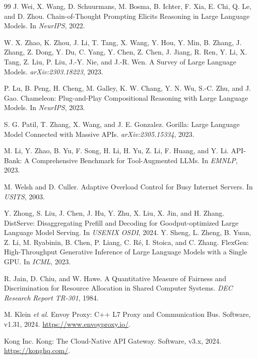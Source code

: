 \documentclass[sigconf,review,anonymous]{acmart}
\begin{document}
\begin{thebibliography}{99}
J. Wei, X. Wang, D. Schuurmans, M. Bosma, B. Ichter, F. Xia, E. Chi, Q. Le, and D. Zhou.
\newblock Chain-of-Thought Prompting Elicits Reasoning in Large Language Models.
\newblock In \emph{NeurIPS}, 2022.

W. X. Zhao, K. Zhou, J. Li, T. Tang, X. Wang, Y. Hou, Y. Min, B. Zhang, J. Zhang, Z. Dong, Y. Du, C. Yang, Y. Chen, Z. Chen, J. Jiang, R. Ren, Y. Li, X. Tang, Z. Liu, P. Liu, J.-Y. Nie, and J.-R. Wen.
\newblock A Survey of Large Language Models.
\newblock \emph{arXiv:2303.18223}, 2023.

P. Lu, B. Peng, H. Cheng, M. Galley, K. W. Chang, Y. N. Wu, S.-C. Zhu, and J. Gao.
\newblock Chameleon: Plug-and-Play Compositional Reasoning with Large Language Models.
\newblock In \emph{NeurIPS}, 2023.

S. G. Patil, T. Zhang, X. Wang, and J. E. Gonzalez.
\newblock Gorilla: Large Language Model Connected with Massive APIs.
\newblock \emph{arXiv:2305.15334}, 2023.

M. Li, Y. Zhao, B. Yu, F. Song, H. Li, H. Yu, Z. Li, F. Huang, and Y. Li.
\newblock API-Bank: A Comprehensive Benchmark for Tool-Augmented LLMs.
\newblock In \emph{EMNLP}, 2023.

M. Welsh and D. Culler.
\newblock Adaptive Overload Control for Busy Internet Servers.
\newblock In \emph{USITS}, 2003.

Y. Zhong, S. Liu, J. Chen, J. Hu, Y. Zhu, X. Liu, X. Jin, and H. Zhang.
\newblock DistServe: Disaggregating Prefill and Decoding for Goodput-optimized Large Language Model Serving.
\newblock In \emph{USENIX OSDI}, 2024.
Y. Sheng, L. Zheng, B. Yuan, Z. Li, M. Ryabinin, B. Chen, P. Liang, C. R\'{e}, I. Stoica, and C. Zhang.
\newblock FlexGen: High-Throughput Generative Inference of Large Language Models with a Single GPU.
\newblock In \emph{ICML}, 2023.

R. Jain, D. Chiu, and W. Hawe.
\newblock A Quantitative Measure of Fairness and Discrimination for Resource Allocation in Shared Computer Systems.
\newblock \emph{DEC Research Report TR-301}, 1984.

M. Klein \emph{et al.}
\newblock Envoy Proxy: C++ L7 Proxy and Communication Bus.
\newblock Software, v1.31, 2024.
\newblock \url{https://www.envoyproxy.io/}.

Kong Inc.
\newblock Kong: The Cloud-Native API Gateway.
\newblock Software, v3.x, 2024.
\newblock \url{https://konghq.com/}.

\end{thebibliography}
\end{document}

